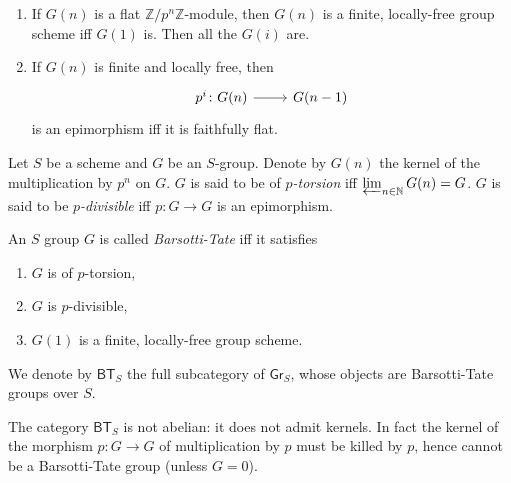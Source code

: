 \documentclass[../Main]{subfiles}
\begin{document}
\begin{lem}\leavevmode\vspace{-.2\baselineskip}
\begin{enumerate}
	\item If $G(n)$ is a flat $\mathbb{Z}/p^n\mathbb{Z}$-module, then $G(n)$
		is a finite, locally-free group scheme iff
		$G(1)$ is. Then all the $G(i)$ are.

	\item If $G(n)$ is finite and locally free, then
		\begin{equation}
		\begin{tikzcd}[row sep = 0ex
			,/tikz/column 1/.append style={anchor=base east}
			,/tikz/column 2/.append style={anchor=base west}]
			p^i\colon G(n) \arrow[r, "", rightarrow] &
			G(n-1)
		\end{tikzcd}
		\end{equation} 
		is an epimorphism iff it is faithfully flat.
\end{enumerate}
\end{lem} 


\begin{defn}
	Let $S$ be a scheme and $G$ be an $S$-group.
	Denote by $G(n)$ the kernel of the multiplication by $p^n$ on $G$.
	$G$ is said to be of {\em $p$-torsion} iff $\varprojlim_{n \in \mathbb{N}} G(n) = G$.
	$G$ is said to be {\em $p$-divisible} iff $p\colon G \to G$
	is an epimorphism.
\end{defn}


\begin{defn}
	An $S$ group $G$ is called {\em Barsotti-Tate} iff it satisfies
\begin{enumerate}
	\item $G$ is of $p$-torsion,
	\item $G$ is $p$-divisible,
	\item $G(1)$ is a finite, locally-free group scheme.
\end{enumerate}
	We denote by $\mathsf{BT}_S$ the full subcategory of $\mathsf{Gr}_S$,
	whose objects are Barsotti-Tate groups over $S$.
\end{defn}


\begin{rem}[]
	The category $\mathsf{BT}_S$ is not abelian:
	it does not admit kernels.
	In fact the kernel of the morphism $p\colon G \to G$
	of multiplication by $p$ must be killed by $p$, hence cannot be
	a Barsotti-Tate group (unless $G=0$).
\end{rem}
\end{document}
